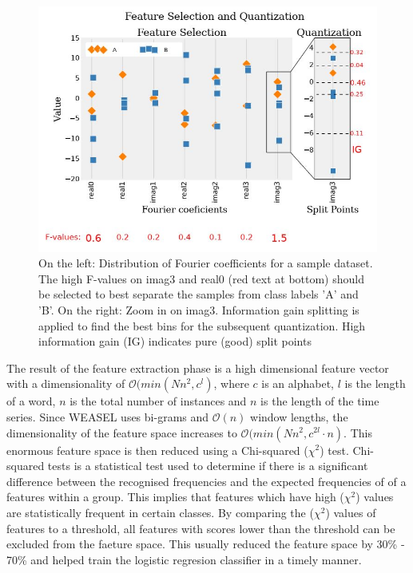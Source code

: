 \begin{figure}[!htbp]
    \captionsetup{justification=raggedright}
    \centering
    \includegraphics[scale = 0.5]{WEASEL_FEATURE.JPG}
    \centering
    \caption{On the left: Distribution of Fourier coefficients for a sample dataset. The high F-values on imag3 and real0 (red text at bottom) should be selected to best separate the samples from class labels ’A’ and ’B’. On the right: Zoom in on imag3. Information gain splitting is applied to find the best bins for the subsequent quantization. High information gain (IG) indicates pure (good) split points \cite{schafer2017fast}}
    \label{Img:WEASEL_FEATURE}
\end{figure}

The result of the feature extraction phase is a high dimensional feature vector with a dimensionality of $\mathcal{O}(min(Nn^{2},c^{l})$,
where $c$ is an alphabet, $l$ is the length of a word, $n$ is the total number of instances and $n$ is the length of the time series.
Since WEASEL uses bi-grams and $\mathcal{O}(n)$ window lengths, the dimensionality of the feature space increases to $\mathcal{O}(min(Nn^{2},c^{2l} \cdot n)$.
This enormous feature space is then reduced using a Chi-squared ($\chi^{2}$) test. Chi-squared tests is a statistical test used to determine if there is a significant difference
between the recognised frequencies and the expected frequencies of of a features within a group. This implies that features which have high ($\chi^{2}$) values are statistically
frequent in certain classes. By comparing the ($\chi^{2}$) values of features to a threshold, all features with scores lower than the threshold can be excluded from the faeture space.
This usually reduced the feature space by 30\% - 70\% and helped train the logistic regresion classifier in a timely manner.